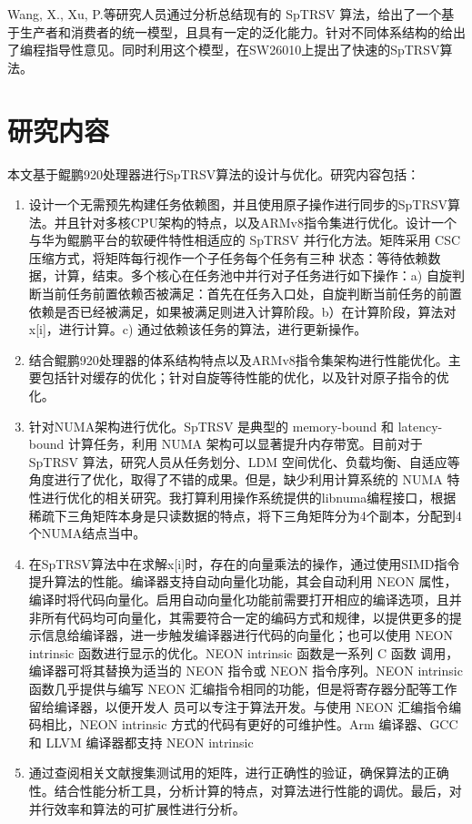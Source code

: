 Wang, X., Xu, P.\cite{wangFastSparseTriangular2018}等研究人员通过分析总结现有的 SpTRSV 算法，给出了一个基于生产者和消费者的统一模型，且具有一定的泛化能力。针对不同体系结构的给出了编程指导性意见。同时利用这个模型，在SW26010上提出了快速的SpTRSV算法。

\section{研究内容}

本文基于鲲鹏920处理器进行SpTRSV算法的设计与优化。研究内容包括：

\begin{enumerate} \setlength{\itemsep}{0pt}
    \item 设计一个无需预先构建任务依赖图，并且使用原子操作进行同步的SpTRSV算法。并且针对多核CPU架构的特点，以及ARMv8指令集进行优化。设计一个与华为鲲鹏平台的软硬件特性相适应的 SpTRSV 并行化方法。矩阵采用 CSC 压缩方式，将矩阵每行视作一个子任务每个任务有三种 状态：等待依赖数据，计算，结束。多个核心在任务池中并行对子任务进行如下操作：a) 自旋判断当前任务前置依赖否被满足：首先在任务入口处，自旋判断当前任务的前置依赖是否已经被满足，如果被满足则进入计算阶段。b）在计算阶段，算法对x[i]，进行计算。c) 通过依赖该任务的算法，进行更新操作。
    \item 结合鲲鹏920处理器的体系结构特点以及ARMv8指令集架构进行性能优化。主要包括针对缓存的优化；针对自旋等待性能的优化，以及针对原子指令的优化。
    \item 针对NUMA架构进行优化。SpTRSV 是典型的 memory-bound 和 latency-bound 计算任务，利用 NUMA 架构可以显著提升内存带宽。目前对于 SpTRSV 算法，研究人员从任务划分、LDM 空间优化、负载均衡、自适应等角度进行了优化，取得了不错的成果。但是，缺少利用计算系统的 NUMA 特性进行优化的相关研究。我打算利用操作系统提供的libnuma编程接口，根据稀疏下三角矩阵本身是只读数据的特点，将下三角矩阵分为4个副本，分配到4个NUMA结点当中。
    \item 在SpTRSV算法中在求解x[i]时，存在的向量乘法的操作，通过使用SIMD指令提升算法的性能。编译器支持自动向量化功能，其会自动利用 NEON 属性，编译时将代码向量化。启用自动向量化功能前需要打开相应的编译选项，且并非所有代码均可向量化，其需要符合一定的编码方式和规律，以提供更多的提示信息给编译器，进一步触发编译器进行代码的向量化；也可以使用 NEON intrinsic 函数进行显示的优化。NEON intrinsic 函数是一系列 C 函数 调用，编译器可将其替换为适当的 NEON 指令或 NEON 指令序列。NEON intrinsic 函数几乎提供与编写 NEON 汇编指令相同的功能，但是将寄存器分配等工作留给编译器，以便开发人 员可以专注于算法开发。与使用 NEON 汇编指令编码相比，NEON intrinsic 方式的代码有更好的可维护性。Arm 编译器、GCC 和 LLVM 编译器都支持 NEON intrinsic
    \item 通过查阅相关文献搜集测试用的矩阵，进行正确性的验证，确保算法的正确性。结合性能分析工具，分析计算的特点，对算法进行性能的调优。最后，对并行效率和算法的可扩展性进行分析。
\end{enumerate}

